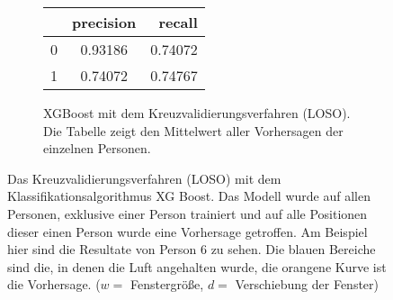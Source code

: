 \begin{figure}[H]
  \begin{subfigure}{1\textwidth}
      \begin{center}
          \begin{tabular}{ | l | c | r | }
            \hline
             & precision & recall \\ \hline
            0 & 0.93186 & 0.74072 \\ \hline
            1 & 0.74072 & 0.74767 \\
            \hline
          \end{tabular}
      \end{center}
      \caption{XGBoost mit dem Kreuzvalidierungsverfahren (LOSO). Die Tabelle zeigt den Mittelwert aller Vorhersagen der einzelnen Personen.}
      \label{implementation:app:screenshots:user_studies_information}
  \end{subfigure}
    \caption{Das Kreuzvalidierungsverfahren (LOSO) mit dem Klassifikationsalgorithmus XG Boost. Das Modell wurde auf allen Personen, exklusive einer Person trainiert und auf alle Positionen dieser einen Person wurde eine Vorhersage getroffen. Am Beispiel hier sind die Resultate von Person 6 zu sehen. Die blauen Bereiche sind die, in denen die Luft angehalten wurde, die orangene Kurve ist die Vorhersage. ($w=$ Fenstergröße, $d=$ Verschiebung der Fenster)}
\label{evaluation:xgboost_loso:person6}
\end{figure}

